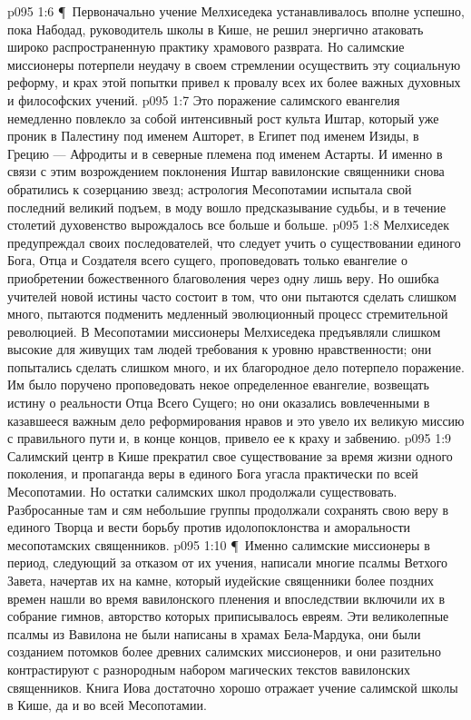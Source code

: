 \vs p095 1:6 \P\ Первоначально учение Мелхиседека устанавливалось вполне успешно, пока Набодад, руководитель школы в Кише, не решил энергично атаковать широко распространенную практику храмового разврата. Но салимские миссионеры потерпели неудачу в своем стремлении осуществить эту социальную реформу, и крах этой попытки привел к провалу всех их более важных духовных и философских учений.
\vs p095 1:7 Это поражение салимского евангелия немедленно повлекло за собой интенсивный рост культа Иштар, который уже проник в Палестину под именем Ашторет, в Египет под именем Изиды, в Грецию --- Афродиты и в северные племена под именем Астарты. И именно в связи с этим возрождением поклонения Иштар вавилонские священники снова обратились к созерцанию звезд; астрология Месопотамии испытала свой последний великий подъем, в моду вошло предсказывание судьбы, и в течение столетий духовенство вырождалось все больше и больше.
\vs p095 1:8 Мелхиседек предупреждал своих последователей, что следует учить о существовании единого Бога, Отца и Создателя всего сущего, проповедовать только евангелие о приобретении божественного благоволения через одну лишь веру. Но ошибка учителей новой истины часто состоит в том, что они пытаются сделать слишком много, пытаются подменить медленный эволюционный процесс стремительной революцией. В Месопотамии миссионеры Мелхиседека предъявляли слишком высокие для живущих там людей требования к уровню нравственности; они попытались сделать слишком много, и их благородное дело потерпело поражение. Им было поручено проповедовать некое определенное евангелие, возвещать истину о реальности Отца Всего Сущего; но они оказались вовлеченными в казавшееся важным дело реформирования нравов и это увело их великую миссию с правильного пути и, в конце концов, привело ее к краху и забвению.
\vs p095 1:9 Салимский центр в Кише прекратил свое существование за время жизни одного поколения, и пропаганда веры в единого Бога угасла практически по всей Месопотамии. Но остатки салимских школ продолжали существовать. Разбросанные там и сям небольшие группы продолжали сохранять свою веру в единого Творца и вести борьбу против идолопоклонства и аморальности месопотамских священников.
\vs p095 1:10 \P\ Именно салимские миссионеры в период, следующий за отказом от их учения, написали многие псалмы Ветхого Завета, начертав их на камне, который иудейские священники более поздних времен нашли во время вавилонского пленения и впоследствии включили их в собрание гимнов, авторство которых приписывалось евреям. Эти великолепные псалмы из Вавилона не были написаны в храмах Бела\hyp{}Мардука, они были созданием потомков более древних салимских миссионеров, и они разительно контрастируют с разнородным набором магических текстов вавилонских священников. Книга Иова достаточно хорошо отражает учение салимской школы в Кише, да и во всей Месопотамии.
